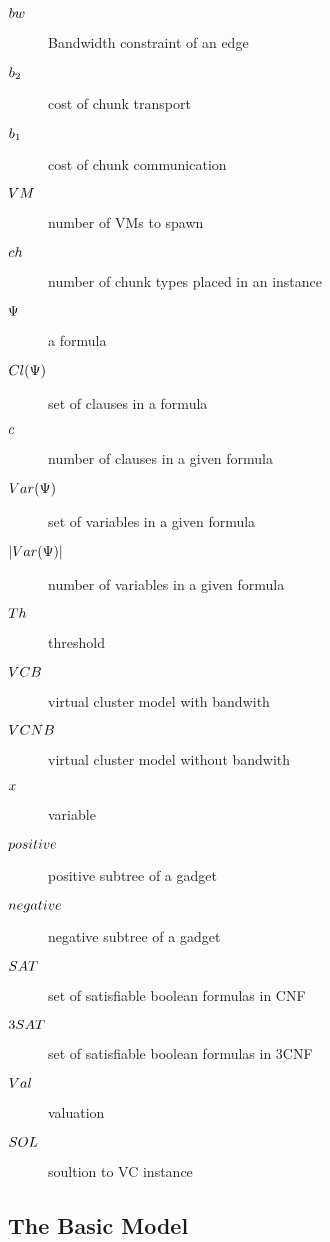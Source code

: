 \begin{description}
 
 \item [$bw$] Bandwidth constraint of an edge 
 \item [$b_2$] cost of chunk transport 
 \item [$b_1$] cost of chunk communication
 \item [$VM$] number of VMs to spawn 
 \item [$ch$] number of chunk types placed in an instance 
 \item [$\Psi$] a formula
 \item [$Cl(\Psi)$] set of clauses in a formula 
 \item [$c$] number of clauses in a given formula 
 \item [$Var(\Psi)$] set of variables in a given formula
 \item [$|Var(\Psi)|$] number of variables in a given formula
 \item [$Th$] threshold
 \item [$VCB$] virtual cluster model with bandwith 
 \item [$VCNB$] virtual cluster model without bandwith 
 \item [$x$] variable
 \item [$positive$] positive subtree of a gadget 
 \item [$negative$] negative subtree of a gadget 
 \item [$SAT$] set of satisfiable boolean formulas in CNF
 \item [$3SAT$] set of satisfiable boolean formulas in 3CNF
 \item [$Val$] valuation
 \item [$SOL$] soultion to VC instance
 
\end{description}



\subsection{The Basic Model}


